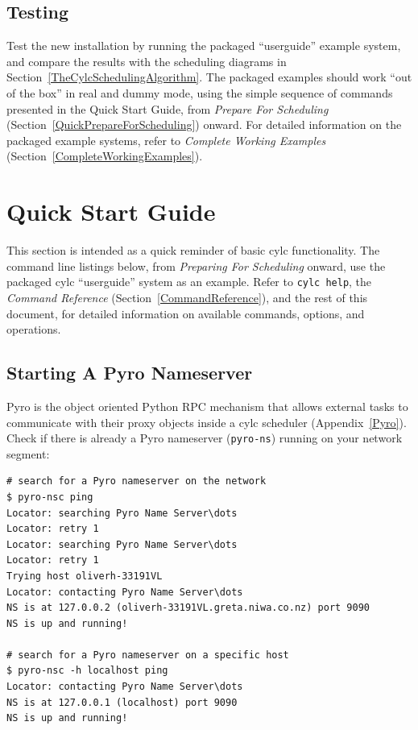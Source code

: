 \documentclass[11pt,a4paper]{article}
\begin{document}
\subsection{Testing} 
\label{Testing}

Test the new installation by running the packaged ``userguide'' example
system, and compare the results with the scheduling diagrams in
Section~\ref{TheCylcSchedulingAlgorithm}. The packaged examples should
work ``out of the box'' in real and dummy mode, using the simple
sequence of commands presented in the Quick Start Guide, from {\em
Prepare For Scheduling} (Section~\ref{QuickPrepareForScheduling})
onward.  For detailed information on the packaged example systems, refer
to {\em Complete Working Examples}
(Section~\ref{CompleteWorkingExamples}).  

\pagebreak
\section{Quick Start Guide} 
\label{QuickStartGuide}

\lstset{language=bash}

This section is intended as a quick reminder of basic cylc
functionality. The command line listings below, from {\em Preparing For
Scheduling} onward, use the packaged cylc ``userguide'' system as an
example. Refer to \lstinline=cylc help=, the {\em Command Reference}
(Section~\ref{CommandReference}), and the rest of this document, for
detailed information on available commands, options, and operations.

\subsection{Starting A Pyro Nameserver}
\label{QuickStartingAPyroNameserver}

Pyro is the object oriented Python RPC mechanism that allows external
tasks to communicate with their proxy objects inside a cylc scheduler
(Appendix~\ref{Pyro}). Check if there is already a Pyro nameserver
(\lstinline=pyro-ns=) running on your network segment:

\begin{lstlisting}
# search for a Pyro nameserver on the network
$ pyro-nsc ping
Locator: searching Pyro Name Server\dots
Locator: retry 1
Locator: searching Pyro Name Server\dots
Locator: retry 1
Trying host oliverh-33191VL
Locator: contacting Pyro Name Server\dots
NS is at 127.0.0.2 (oliverh-33191VL.greta.niwa.co.nz) port 9090
NS is up and running!

# search for a Pyro nameserver on a specific host
$ pyro-nsc -h localhost ping
Locator: contacting Pyro Name Server\dots
NS is at 127.0.0.1 (localhost) port 9090
NS is up and running!
\end{lstlisting}
\end{document}
